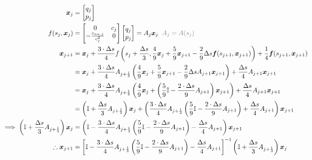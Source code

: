 \documentclass{article}
\begin{document}
\begin{align*}
	\bm{x}_j                                                                       & =\begin{bmatrix} q_{j} \\ p_{j} \end{bmatrix}                                                                                                                                                                                                \\
	f(s_{j}, \bm{x}_j)                                                             & = \begin{bmatrix} 0 & c_{j} \\ -\frac{c_{nn, j}}{c_j^2} & 0\end{bmatrix}\begin{bmatrix}q_j \\ p_j\end{bmatrix} = A_j\bm{x}_j\textcolor{gray}{\;\;A_j=A(s_j)}                                                           \\
	\bm{x}_{j+1}                                                                   & = \bm{x}_j + \frac{3\cdot \Delta s}{4}f\left(s_{j}+\frac{\Delta s}{3}, \frac{4}{9}\bm{x}_j+\frac{5}{9}\bm{x}_{j+1}-\frac{2}{9}\Delta s \bm{f}(s_{j+1}, \bm{x}_{j+1})\right) + \frac{1}{4}\bm{f}(s_{j+1}, \bm{x}_{j+1})                       \\
	                                                                               & =\bm{x}_j + \frac{3\cdot\Delta s}{4}A_{j+\frac{1}{3}}\left(\frac{4}{9}\bm{x}_j + \frac{5}{9}\bm{x}_{j+1}-\frac{2}{9}\Delta sA_{j+1}\bm{x}_{j+1}\right) + \frac{\Delta s}{4}A_{j+1}\bm{x}_{j+1}                                               \\
	                                                                               & = \bm{x}_j + \frac{3\cdot\Delta s}{4}A_{j+\frac{1}{3}}\left(\frac{4}{9}\bm{x}_j + \left(\frac{5}{9}\mathbb{I}-\frac{2\cdot\Delta s}{9}A_{j+1}\right)\bm{x}_{j+1} \right) + \frac{\Delta s}{4}A_{j+1}\bm{x}_{j+1}                             \\
	                                                                               & = \left(\mathbb{I} + \frac{\Delta s}{3}A_{j+\frac{1}{3}}\right)\bm{x}_j + \left(\frac{3\cdot\Delta s}{4}A_{j+\frac{1}{3}}\left(\frac{5}{9}\mathbb{I}-\frac{2\cdot\Delta s}{9}A_{j+1}\right)+\frac{\Delta s}{4}A_{j+1}\right)\bm{x}_{j+1}     \\
	\implies \left(\mathbb{I} + \frac{\Delta s}{3}A_{j+\frac{1}{3}}\right)\bm{x}_j & =\left(\mathbb{I} - \frac{3\cdot\Delta s}{4}A_{j+\frac{1}{3}}\left(\frac{5}{9}\mathbb{I}-\frac{2\cdot\Delta s}{9}A_{j+1}\right)- \frac{\Delta s}{4}A_{j+1}\right)\bm{x}_{j+1}                                                                \\
	\therefore \bm{x}_{j+1}                                                        & = \left[\mathbb{I} - \frac{3\cdot\Delta s}{4}A_{j+\frac{1}{3}}\left(\frac{5}{9}\mathbb{I}-\frac{2\cdot\Delta s}{9}A_{j+1}\right)- \frac{\Delta s}{4}A_{j+1}\right]^{-1}\left(\mathbb{I} + \frac{\Delta s}{3}A_{j+\frac{1}{3}}\right)\bm{x}_j
\end{align*}
\end{document}
